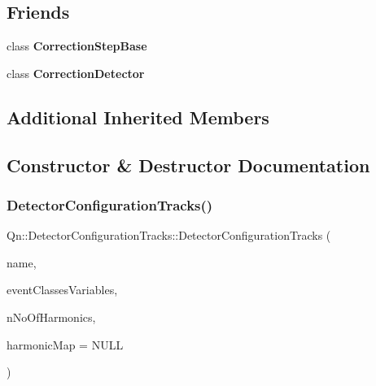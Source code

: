 \subsection*{Friends}
\begin{DoxyCompactItemize}
\item 
\mbox{\label{classQn_1_1DetectorConfigurationTracks_afbb351f0a159c2e61159977b03f4b3c1}} 
class {\bfseries Correction\+Step\+Base}
\item 
\mbox{\label{classQn_1_1DetectorConfigurationTracks_aaaec1af05216df7a0fa18215ef18023b}} 
class {\bfseries Correction\+Detector}
\end{DoxyCompactItemize}
\subsection*{Additional Inherited Members}


\subsection{Constructor \& Destructor Documentation}
\mbox{\label{classQn_1_1DetectorConfigurationTracks_aa98f7415c841d953a1c8b78d874c19d5}} 
\subsubsection{\texorpdfstring{Detector\+Configuration\+Tracks()}{DetectorConfigurationTracks()}}
{\footnotesize\ttfamily Qn\+::\+Detector\+Configuration\+Tracks\+::\+Detector\+Configuration\+Tracks (\begin{DoxyParamCaption}\item[{const char $\ast$}]{name,  }\item[{\mbox{\hyperlink{classQn_1_1EventClassVariablesSet}{Event\+Class\+Variables\+Set}} $\ast$}]{event\+Classes\+Variables,  }\item[{Int\+\_\+t}]{n\+No\+Of\+Harmonics,  }\item[{Int\+\_\+t $\ast$}]{harmonic\+Map = {\ttfamily NULL} }\end{DoxyParamCaption})}

